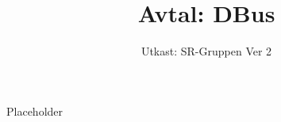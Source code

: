 \documentclass[a4paper]{dtek}
\title{Avtal: DBus}
\date{Utkast: SR-Gruppen Ver 2}
\begin{document}
Placeholder
\end{document}
